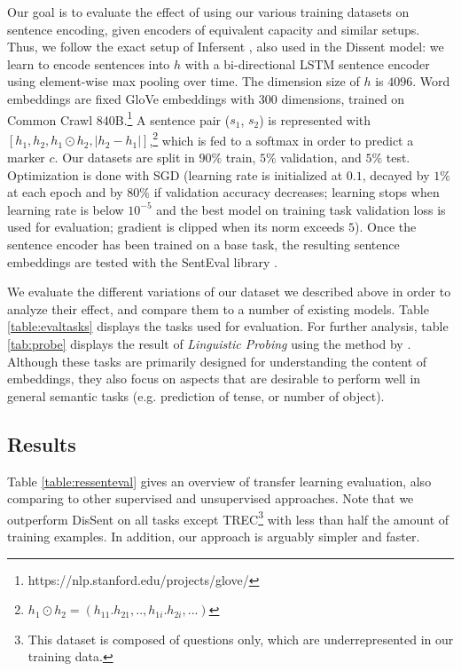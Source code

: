 \documentclass[11pt,a4paper]{article}
\begin{document}
Our goal is to evaluate the effect of using our various training datasets on sentence encoding, given encoders of equivalent capacity and similar setups.
Thus, we follow the exact setup of Infersent \citep{Conneau2017}, also used in the Dissent \citep{Malmi2018} model: we learn to encode sentences into $h$ with a bi-directional LSTM  sentence encoder using element-wise max pooling over time. 
The dimension size of $h$ is $4096$.  Word embeddings are fixed GloVe embeddings with 300 dimensions, trained on Common Crawl 840B.\footnote{https://nlp.stanford.edu/projects/glove/} 
A sentence pair ($s_1$, $s_2$) is represented with $ [h_1, h_2, h_1 \odot h_2, |h_2-h_1|]$,\footnote{$h_1 \odot h_2 = (h_{11}.h_{21},..,h_{1i}.h_{2i},...)$} which is fed to a softmax in order to predict a marker $c$.
Our datasets are split in $90\%$ train, $5\%$ validation, and $5\%$ test. 
Optimization is done with SGD (learning rate is initialized at $0.1$, decayed by $1\%$ at each epoch and by $80\%$ if validation accuracy decreases; learning stops when learning rate is below $10^{-5}$ and the best model on training task validation loss is used for evaluation; gradient is clipped when its norm exceeds $5$). Once the sentence encoder has been trained on a base task, the resulting sentence embeddings are tested with the SentEval library \citep{Conneau2017}.

We evaluate the different variations of our dataset we described above in order to analyze their effect, and compare them to a number of existing models. Table \ref{table:evaltasks} displays the tasks used for evaluation.
For further analysis, table \ref{tab:probe} displays the result of {\it Linguistic Probing} using the method by \citet{ConneauProbe}.  Although these tasks are primarily designed for understanding the content of embeddings, they also focus on aspects that are desirable to perform well in general semantic tasks (e.g. prediction of tense, or number of object).

\subsection{Results}
Table \ref{table:ressenteval} gives an overview of transfer learning evaluation, also comparing to other supervised and unsupervised approaches.
Note that we outperform DisSent on all tasks except TREC\footnote{This dataset is composed of questions only, which are underrepresented in our training data.} with less than half the amount of training examples. In addition, our approach is arguably simpler and faster.
\end{document}
